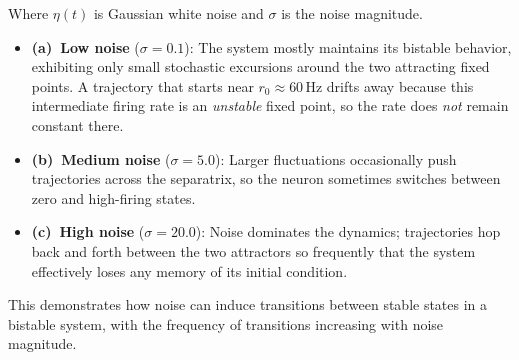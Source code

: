 \documentclass{article}
\begin{document}
Where $\eta(t)$ is Gaussian white noise and $\sigma$ is the noise magnitude.

\begin{itemize}
    \item \textbf{(a)~Low noise} ($\sigma = 0.1$): The system mostly maintains its bistable behavior, exhibiting only small stochastic excursions around the two attracting fixed points.  A trajectory that starts near $r_0 \!\approx\! 60\,$Hz drifts away because this intermediate firing rate is an \emph{unstable} fixed point, so the rate does \emph{not} remain constant there. 
    \item \textbf{(b)~Medium noise} ($\sigma = 5.0$): Larger fluctuations occasionally push trajectories across the separatrix, so the neuron sometimes switches between zero and high-firing states.
    \item \textbf{(c)~High noise} ($\sigma = 20.0$): Noise dominates the dynamics; trajectories hop back and forth between the two attractors so frequently that the system effectively loses any memory of its initial condition.
\end{itemize}

This demonstrates how noise can induce transitions between stable states in a bistable system, with the frequency of transitions increasing with noise magnitude.
\end{document}
